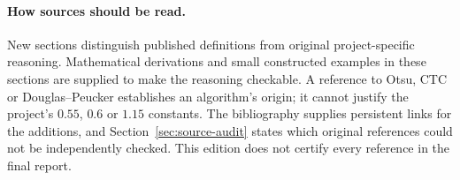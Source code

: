 \paragraph{How sources should be read.}
New sections distinguish published definitions from original project-specific
reasoning. Mathematical derivations and small constructed examples in these
sections are supplied to make the reasoning checkable. A reference to Otsu,
CTC or Douglas--Peucker establishes an algorithm's origin; it cannot justify
the project's $0.55$, $0.6$ or $1.15$ constants. The bibliography supplies
persistent links for the additions, and Section~\ref{sec:source-audit} states
which original references could not be independently checked. This edition
does not certify every reference in the final report.
